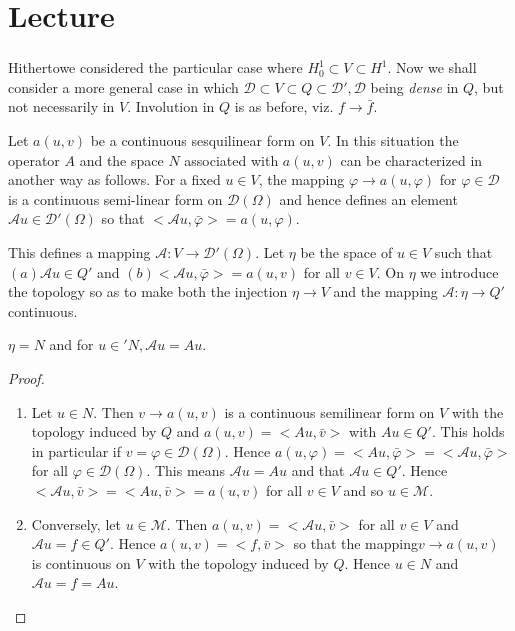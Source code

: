 
\chapter{Lecture}\label{lec7}%

\setcounter{section}{3}
\subsection{}\label{lec7:sec3:subsec4}  

Hitherto\pageoriginale we considered the particular
case where $H^1_0 \subset V \subset  H^1$. Now we shall consider a
more general case in which $\mathscr{D} \subset V \subset Q \subset
\mathscr{D}', \mathscr{D}$ being \textit{dense} in $Q$, but not
necessarily in $V$. Involution in $Q$ is as before, viz. $f
\rightarrow \bar{f}$. 

Let $a(u, v)$ be a continuous sesquilinear form on $V$. In this
situation the operator $A$ and the space $N$ associated with $a(u, v)$
can be characterized in another way as follows. For a fixed $u
\in V$, the mapping $\varphi \rightarrow a(u, \varphi)$ for
$\varphi \in \mathscr{D}$ is a continuous semi-linear form on
$\mathscr{D}(\Omega)$ and hence defines an element $\mathscr{A} u
\in \mathscr{D}' (\Omega)$ so that $<\mathscr{A}u,
\bar{\varphi}> = a(u, \varphi)$. 

This defines a mapping $\mathscr{A} : V \rightarrow \mathscr{D}'
(\Omega)$. Let $\eta$ be the space of $u \in V$ such that $(a)
\mathscr{A} u \in Q'$ and $(b) <\mathscr{A}u, \bar{\varphi}> =
a(u, v) $ for all $v \in V$. On $\eta$ we introduce the
topology so as to make both the injection $\eta \rightarrow V$ and the
mapping $\mathscr{A} : \eta \rightarrow Q'$ continuous. 

\begin{theorem}\label{lec7:sec3:subsec4:thm3.5}%
  $\eta = N$ and for $u \in' N, \mathscr{A}u = Au$.
\end{theorem}

\begin{proof}
\begin{enumerate}[1)]
\item Let $u \in N$. Then $v \rightarrow a (u, v)$ is a
  continuous semilinear form on $V$ with the topology induced by $Q$
  and $a(u, v) = <Au, \bar{v}>$ with $Au \in Q'$. This holds
  in particular if $v= \varphi \in \mathscr{D}
  (\Omega)$. Hence $a(u, \varphi) = <Au, \bar{\varphi}> =
  <\mathscr{A}u, \bar{\varphi}>$ for all $\varphi \in
  \mathscr{D}(\Omega)$. This means $\mathscr{A}u =Au$ and that
  $\mathscr{A} u \in Q'$. Hence $<\mathscr{A}u, \bar{v}> =
  <Au, \bar{v}> = a(u, v)$ for all $v \in V$ and so $u
  \in \mathcal{M}$. 
\item Conversely, let $u \in \mathcal{M}$. Then $a(u, v) =
  <\mathscr{A}u, \bar{v}>$ for all $v \in V$ and $\mathscr{A}u
  = f \in Q'$. Hence $a(u, v) = <f, \bar{v}>$ so that the
  mapping\pageoriginale $v \rightarrow a(u, v)$ is continuous on $V$ with the
  topology induced by $Q$. Hence $u \in N$ and $\mathscr{A}u =
  f = Au$. 
\end{enumerate}
\end{proof}

